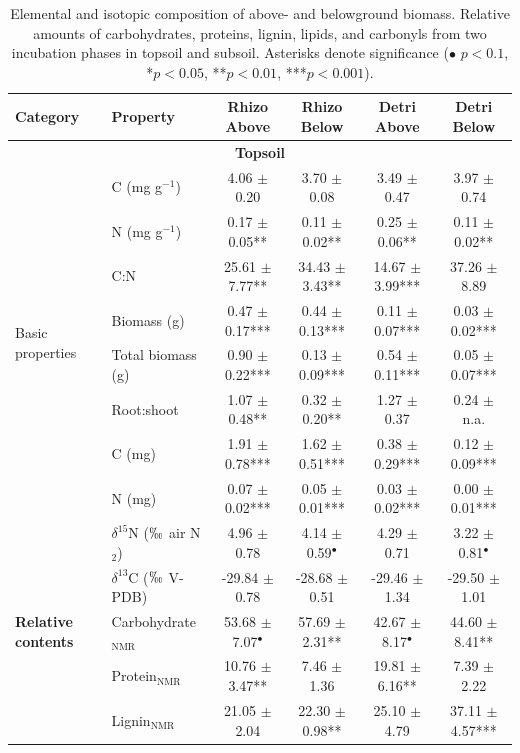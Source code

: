 \begin{table}[htbp]
  \centering
  \scriptsize
  \caption{Elemental and isotopic composition of above- and belowground biomass. Relative amounts of carbohydrates, proteins, lignin, lipids, and carbonyls from two incubation phases in topsoil and subsoil. Asterisks denote significance ($\bullet$ $p < 0.1$, *$p < 0.05$, **$p < 0.01$, ***$p < 0.001$).}
  \begin{tabular}{llcccc}
  \toprule
  \textbf{Category} & \textbf{Property} & Rhizo Above & Rhizo Below & Detri Above & Detri Below \\
  \midrule
  \multicolumn{6}{c}{\textbf{Topsoil}} \\
  \midrule
  \multirow{8}{*}{Basic properties} & C (mg g$^{-1}$) & 4.06 $\pm$ 0.20 & 3.70 $\pm$ 0.08 & 3.49 $\pm$ 0.47 & 3.97 $\pm$ 0.74 \\
  & N (mg g$^{-1}$) & 0.17 $\pm$ 0.05** & 0.11 $\pm$ 0.02** & 0.25 $\pm$ 0.06** & 0.11 $\pm$ 0.02** \\
  & C:N & 25.61 $\pm$ 7.77** & 34.43 $\pm$ 3.43** & 14.67 $\pm$ 3.99*** & 37.26 $\pm$ 8.89 \\
  & Biomass (g) & 0.47 $\pm$ 0.17*** & 0.44 $\pm$ 0.13*** & 0.11 $\pm$ 0.07*** & 0.03 $\pm$ 0.02*** \\
  & Total biomass (g) & 0.90 $\pm$ 0.22*** & 0.13 $\pm$ 0.09*** & 0.54 $\pm$ 0.11*** & 0.05 $\pm$ 0.07*** \\
  & Root:shoot & 1.07 $\pm$ 0.48** & 0.32 $\pm$ 0.20** & 1.27 $\pm$ 0.37 & 0.24 $\pm$ n.a. \\
  & C (mg) & 1.91 $\pm$ 0.78*** & 1.62 $\pm$ 0.51*** & 0.38 $\pm$ 0.29*** & 0.12 $\pm$ 0.09*** \\
  & N (mg) & 0.07 $\pm$ 0.02*** & 0.05 $\pm$ 0.01*** & 0.03 $\pm$ 0.02*** & 0.00 $\pm$ 0.01*** \\
  & $\delta^{15}$N ($\permil$ air N$_2$) & 4.96 $\pm$ 0.78 & 4.14 $\pm$ 0.59$^{\bullet}$ & 4.29 $\pm$ 0.71 & 3.22 $\pm$ 0.81$^{\bullet}$ \\
  & $\delta^{13}$C ($\permil$ V-PDB) & -29.84 $\pm$ 0.78 & -28.68 $\pm$ 0.51 & -29.46 $\pm$ 1.34 & -29.50 $\pm$ 1.01 \\
  \midrule
  \textbf{Relative contents} & Carbohydrate$_{\text{NMR}}$ & 53.68 $\pm$ 7.07$^{\bullet}$ & 57.69 $\pm$ 2.31** & 42.67 $\pm$ 8.17$^{\bullet}$ & 44.60 $\pm$ 8.41** \\
  & Protein$_{\text{NMR}}$ & 10.76 $\pm$ 3.47** & 7.46 $\pm$ 1.36 & 19.81 $\pm$ 6.16** & 7.39 $\pm$ 2.22 \\
  & Lignin$_{\text{NMR}}$ & 21.05 $\pm$ 2.04 & 22.30 $\pm$ 0.98** & 25.10 $\pm$ 4.79 & 37.11 $\pm$ 4.57*** \\

\end{tabular}
\end{table}
